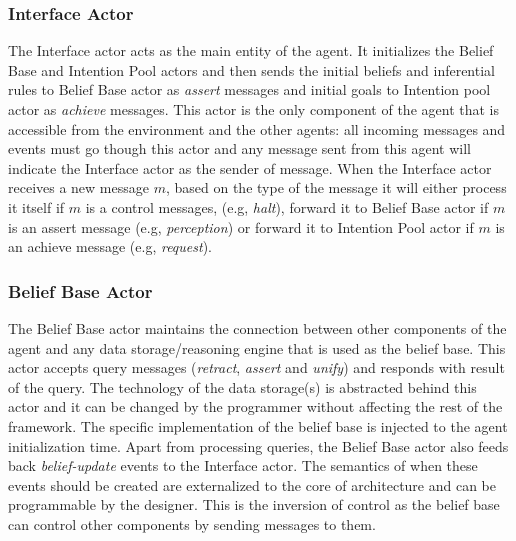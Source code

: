 \subsubsection{Interface Actor}
The Interface actor acts as the main entity of the agent. It initializes the Belief Base and Intention Pool actors and then sends the initial beliefs and inferential rules to Belief Base actor as \textit{assert} messages and initial goals to Intention pool actor as \textit{achieve} messages. This actor is the only component of the agent that is accessible from the environment and the other agents: all incoming messages and events must go though this actor and any message sent from this agent will indicate the Interface actor as the sender of message. When the Interface actor receives a new message $m$, based on the type of the message it will either process it itself if $m$ is a control messages, (e.g, \textit{halt}), forward it to Belief Base actor if $m$ is an assert message (e.g, \textit{perception}) or forward it to Intention Pool actor if $m$ is an achieve message (e.g, \textit{request}).



\subsubsection{Belief Base Actor}
The Belief Base actor maintains the connection between other components of the agent and any data storage/reasoning engine that is used as the belief base. This actor accepts query messages (\textit{retract}, 
\textit{assert} and \textit{unify}) and responds with result of the query. The technology of the data storage(s) is abstracted behind this actor and it can be changed by the programmer without affecting the rest of the framework. The specific implementation of the belief base is injected to the agent initialization time. %
Apart from processing queries, the Belief Base actor also feeds back \textit{belief-update} events to the Interface actor. The semantics of when these events should be created are externalized to the core of architecture and can be programmable by the designer. This is the inversion of control as the belief base can control other components by sending messages to them.

